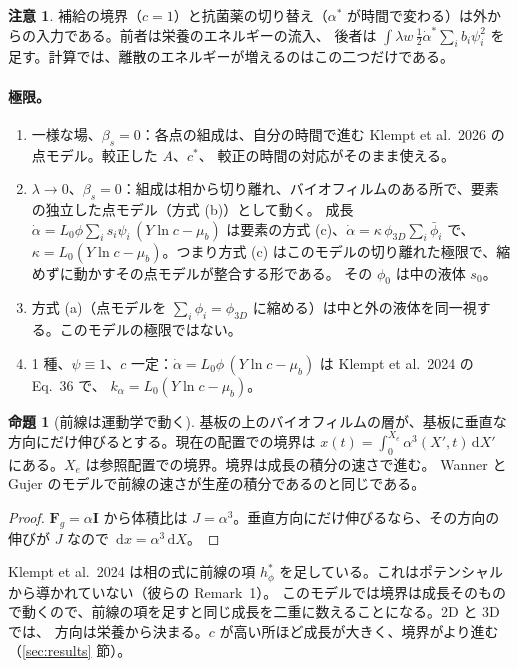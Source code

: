 \documentclass[11pt,a4paper]{article}
\theoremstyle{definition}
\newtheorem{proposition}{命題}
\newtheorem{remark}{注意}
\newcommand{\dd}{\,\mathrm{d}}
\newcommand{\living}{\textstyle\sum_i s_i\psi_i}
\begin{document}
\begin{remark}
補給の境界（$c=1$）と抗菌薬の切り替え（$\alpha^*$ が時間で変わる）は外からの入力である。前者は栄養のエネルギーの流入、
後者は $\int\lambda w\,\tfrac12\dot\alpha^*\sum_ib_i\psi_i^2$ を足す。計算では、離散のエネルギーが増えるのはこの二つだけである。
\end{remark}

\paragraph{極限。}
\begin{enumerate}
\item 一様な場、$\beta_s=0$：各点の組成は、自分の時間で進む Klempt et al.\ 2026 の点モデル。較正した $A$、$c^*$、
  較正の時間の対応がそのまま使える。
\item $\lambda\to0$、$\beta_s=0$：組成は相から切り離れ、バイオフィルムのある所で、要素の独立した点モデル（方式 (b)）として動く。
  成長 $\dot\alpha=L_0\phi\living\,(Y\ln c-\mu_b)$ は要素の方式 (c)、$\dot\alpha=\kappa\,\phi_{3D}\sum_i\bar\phi_i$ で、
  $\kappa=L_0(Y\ln c-\mu_b)$。つまり方式 (c) はこのモデルの切り離れた極限で、縮めずに動かすその点モデルが整合する形である。
  その $\phi_0$ は中の液体 $s_0$。
\item 方式 (a)（点モデルを $\sum_i\phi_i=\phi_{3D}$ に縮める）は中と外の液体を同一視する。このモデルの極限ではない。
\item 1 種、$\psi\equiv1$、$c$ 一定：$\dot\alpha=L_0\phi\,(Y\ln c-\mu_b)$ は Klempt et al.\ 2024 の Eq.~36 で、
  $k_\alpha=L_0(Y\ln c-\mu_b)$。
\end{enumerate}

\begin{proposition}[前線は運動学で動く]\label{prop:front}
基板の上のバイオフィルムの層が、基板に垂直な方向にだけ伸びるとする。現在の配置での境界は
$x(t)=\int_0^{X_e}\alpha^3(X',t)\dd X'$ にある。$X_e$ は参照配置での境界。境界は成長の積分の速さで進む。
Wanner と Gujer のモデルで前線の速さが生産の積分であるのと同じである。
\end{proposition}
\begin{proof}
$\mathbf F_g=\alpha\mathbf I$ から体積比は $J=\alpha^3$。垂直方向にだけ伸びるなら、その方向の伸びが $J$ なので
$\dd x=\alpha^3\dd X$。
\end{proof}
Klempt et al.\ 2024 は相の式に前線の項 $h^*_\phi$ を足している。これはポテンシャルから導かれていない（彼らの Remark~1）。
このモデルでは境界は成長そのもので動くので、前線の項を足すと同じ成長を二重に数えることになる。2D と 3D では、
方向は栄養から決まる。$c$ が高い所ほど成長が大きく、境界がより進む（\ref{sec:results} 節）。
\end{document}
